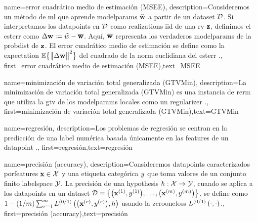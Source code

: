 {name={error cuadrático medio de estimación (MSEE)},
	description={Consideremos un método de \gls{ml} que aprende 
		\gls{modelparams} $\widehat{{\bf w}}$ a partir de un \gls{dataset} $\mathcal{D}$. 
		Si interpretamos los \gls{datapoint}s en $\mathcal{D}$ como \gls{realization}s \gls{iid} de una \gls{rv} ${\bf z}$, 
		definimos el \gls{esterr} como $\Delta {\bf w} := \widehat{w} - \overline{{\bf w}}$. 
		Aquí, $\overline{{\bf w}}$ representa los verdaderos \gls{modelparams} de la \gls{probdist} 
		de ${\bf z}$. El error cuadrático medio de estimación se define como la \gls{expectation} $\mathbb{E} \big\{ \big\| \Delta {\bf w} \big\|^{2} \big\}$ del cuadrado de la 
		\gls{norm} euclidiana del \gls{esterr} \cite{LC,kay}.},
	first={error cuadrático medio de estimación (MSEE)},text={MSEE} 
}

{name={minimización de variación total generalizada (GTVMin)},
	description={La minimización de variación total generalizada (GTVMin) es una instancia de \gls{rerm} 
	que utiliza la \gls{gtv} de los \gls{modelparams} locales como un \gls{regularizer} \cite{ClusteredFLTVMinTSP}.},
	first={minimización de variación total generalizada (GTVMin)},text={GTVMin} 
}

{name={regresión},
	description={Los problemas de regresión se centran en la predicción de una 
		\gls{label} numérica basada únicamente en las \gls{feature}s de un \gls{datapoint} \cite[Ch. 2]{MLBasics}.},
	first={regresión},text={regresión} 
}

{name={precisión (accuracy)},
	description={Consideremos \gls{datapoint}s caracterizados por\gls{feature}s ${\bf x} \in \mathcal{X}$ y 
		una etiqueta categórica $y$ que toma valores de un conjunto finito \gls{labelspace} $\mathcal{Y}$. La 
		precisión de una \gls{hypothesis} $h: \mathcal{X} \rightarrow \mathcal{Y}$, cuando se aplica a los
		\gls{datapoint}s en un \gls{dataset} $\mathcal{D} = \big\{ \big({\bf x}^{(1)}, y^{(1)} \big), \ldots, \big({\bf x}^{(m)},y^{(m)}\big) \big\}$, 
		se define como $1 - (1/m)\sum_{r=1}^{m} L^{(0/1)}\left(\big({\bf x}^{(r)},y^{(r)}\big),h \right)$ usando la \gls{zerooneloss} $L^{(0/1)}\left(\cdot,\cdot \right)$.},
	first={precisión (accuracy)},text={precisión} 
}





